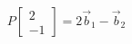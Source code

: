 \documentclass[preview]{standalone}
\begin{document}
\begin{align*}
P\begin{bmatrix}2\\-1\end{bmatrix}=2\vec{b}_1-\vec{b}_2
\end{align*}
\end{document}
